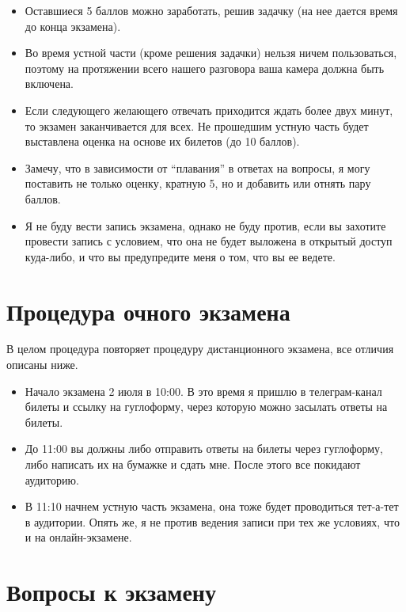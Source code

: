 \documentclass[12pt]{article}
\begin{document}
\begin{itemize}
  \item Оставшиеся 5 баллов можно заработать, решив задачку (на нее дается время до конца экзамена).
  \item Во время устной части (кроме решения задачки) нельзя ничем пользоваться, поэтому на протяжении всего нашего разговора ваша камера должна быть включена.
  \item Если следующего желающего отвечать приходится ждать более двух минут, то экзамен заканчивается для всех. Не прошедшим устную часть будет выставлена оценка на основе их билетов (до 10 баллов).
  \item Замечу, что в зависимости от ``плавания'' в ответах на вопросы, я могу поставить не только оценку, кратную 5, но и добавить или отнять пару баллов. 
  \item Я не буду вести запись экзамена, однако не буду против, если вы захотите провести запись с условием, что она не будет выложена в открытый доступ куда-либо, и что вы предупредите меня о том, что вы ее ведете. 
\end{itemize}


\section*{Процедура очного экзамена}

В целом процедура повторяет процедуру дистанционного экзамена, все отличия описаны ниже.
\begin{itemize}
  \item Начало экзамена 2 июля в 10:00. В это время я пришлю в телеграм-канал билеты и ссылку на гуглоформу, через которую можно засылать ответы на билеты.
  \item До 11:00 вы должны либо отправить ответы на билеты через гуглоформу, либо написать их на бумажке и сдать мне. После этого все покидают аудиторию. 
  \item В 11:10 начнем устную часть экзамена, она тоже будет проводиться тет-а-тет в аудитории. Опять же, я не против ведения записи при тех же условиях, что и на онлайн-экзамене.
\end{itemize}

\newpage

\section*{Вопросы к экзамену}
\end{document}
